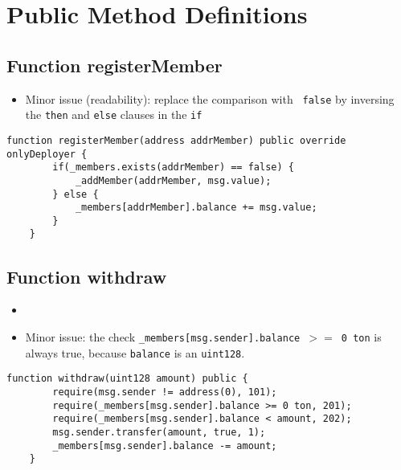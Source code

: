 \section{Public Method Definitions}

\subsection{Function registerMember}

\begin{itemize}
\item Minor issue (readability): replace the comparison with {\tt
  false} by inversing the {\tt then} and {\tt else} clauses in the
  {\tt if}
\end{itemize}

\begin{lstlisting}[firstnumber=24]
    function registerMember(address addrMember) public override onlyDeployer {
        if(_members.exists(addrMember) == false) {
            _addMember(addrMember, msg.value);
        } else {
            _members[addrMember].balance += msg.value;
        }
    }
\end{lstlisting}

\subsection{Function withdraw}

\begin{itemize}
\item {}
\item Minor issue: the check {\tt \_members[msg.sender].balance $>=$ 0
  ton} is always true, because {\tt balance} is an {\tt uint128}.
\end{itemize}

\begin{lstlisting}[firstnumber=37]
    function withdraw(uint128 amount) public {
        require(msg.sender != address(0), 101);
        require(_members[msg.sender].balance >= 0 ton, 201);
        require(_members[msg.sender].balance < amount, 202);
        msg.sender.transfer(amount, true, 1);
        _members[msg.sender].balance -= amount;
    }
\end{lstlisting}
